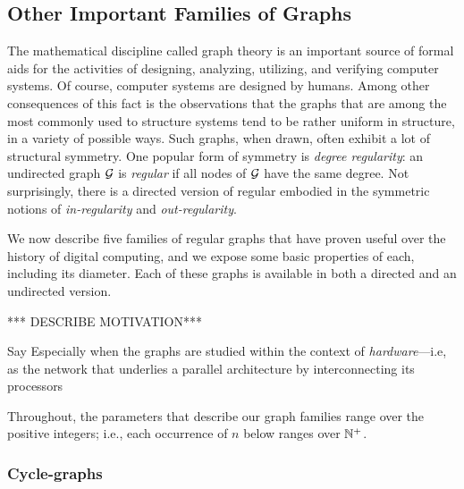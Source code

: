 \subsection{Other Important Families of Graphs}
\label{sec:graphs-important-families}

The mathematical discipline called graph theory is an important source
of formal aids for the activities of designing, analyzing, utilizing,
and verifying computer systems.  Of course, computer systems are
designed by humans.  Among other consequences of this fact is the
observations that the graphs that are among the most commonly used to
structure systems tend to be rather uniform in structure, in a variety
of possible ways.  Such graphs, when drawn, often exhibit a lot of
structural symmetry.  One popular form of symmetry is {\it degree
  regularity}: an undirected graph $\mbox{$\cal G$}$ is {\it regular}
 if all nodes of $\mbox{$\cal G$}$ have the same degree.  Not
surprisingly, there is a directed version of regular embodied in the
symmetric notions of {\it in-regularity}
 and {\it out-regularity}.

We now describe five families of regular graphs that have proven
useful over the history of digital computing, and we expose some basic
properties of each, including its diameter.  Each of these graphs is
available in both a directed and an undirected version.

*** DESCRIBE MOTIVATION***

Say Especially when the graphs are studied within the context of {\em
  hardware}---i.e, as the network that underlies a parallel
architecture by interconnecting its processors

Throughout, the parameters that describe our graph families range over
the positive integers; i.e., each occurrence of $n$ below ranges over
$\mathbb{N}^+$.

\subsubsection{Cycle-graphs}
\label{sec:cycle-graph}

